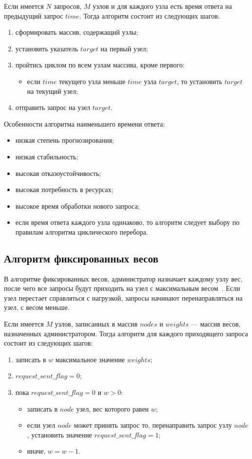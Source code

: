 Если имеется $N$ запросов, $M$ узлов и для каждого узла есть время ответа на предыдущий запрос $time$.
Тогда алгоритм состоит из следующих шагов:

\begin{enumerate}
	\item сформировать массив, содержащий узлы;
	\item установить указатель $target$ на первый узел;
	\item пройтись циклом по всем узлам массива, кроме первого:
	\begin{itemize}
		\item если $time$ текущего узла меньше $time$ узла $target$, то установить $target$ на текущий узел; 
	\end{itemize}
	\item отправить запрос на узел $target$.
\end{enumerate}

Особенности алгоритма наименьшего времени ответа:
\begin{itemize}
	\item низкая степень прогнозирования; 
	\item низкая стабильность;
	\item высокая отказоустойчивость;
	\item высокая потребность в ресурсах;
	\item высокое время обработки нового запроса;
	\item если время ответа каждого узла одинаково, то алгоритм следует выбору по правилам алгоритма циклического перебора.
\end{itemize}

\subsection{Алгоритм фиксированных весов}

В алгоритме фиксированных весов, администратор назначает каждому узлу вес, после чего все запросы будут приходить на узел с максимальным весом~\cite{kemp}.
Если узел перестает справляться с нагрузкой, запросы начинают перенаправляться на узел, с весом меньше.

Если имеется $M$ узлов, записанных в массив $nodes$ и $weights$ --- массив весов, назначенных администратором.
Тогда алгоритм для каждого приходящего запроса состоит из следующих шагов:
\begin{enumerate}
	\item записать в $w$ максимальное значение $weights$;
	\item $request\_sent\_flag = 0$;
	\item пока $request\_sent\_flag = 0$ и $w > 0$:
	\begin{itemize}
		\item записать в $node$ узел, вес которого равен $w$;
		\item если узел $node$ может принять запрос то, перенаправить запрос узлу $node$, установить значение $request\_sent\_flag = 1$;
		\item иначе, $w = w - 1$.
	\end{itemize}
\end{enumerate}

